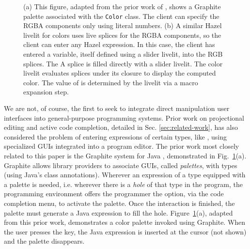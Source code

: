 \begin{figure}
  \caption{
  (a) This figure, adapted from the prior work of \citet{Graphite},
  shows a Graphite palette associated with the \texttt{Color} class.
  The client can specify the RGBA components only using literal numbers.
  (b) A similar Hazel livelit for colors uses live splices for the RGBA components,
  so the client can enter any Hazel expression.
  In this case, the client has entered a variable, itself defined using a slider livelit, into the RGB
  splices. The A splice is filled directly with a slider livelit.
  The color livelit evaluates splices under its closure to display the
  computed color.
  The value of  is determined by the livelit via a macro expansion step.}
  \label{fig:color}
\end{figure}

We are not, of course, the first to seek to integrate direct manipulation user interfaces
into general-purpose programming systems.
Prior work on projectional editing
and active code completion, detailed in Sec. \ref{sec:related-work},
has also considered the problem of entering expressions
of certain types, like ,
using specialized GUIs integrated into a program editor.
The prior work most closely related to this paper is the {Graphite} system for Java \cite{Graphite},
demonstrated in Fig.~\ref{fig:color}(a).
Graphite allows library providers to associate GUIs, called \emph{palettes}, with types (using Java's class annotations).
Wherever an expression of a type equipped with a palette is needed,
i.e. wherever there is a \emph{hole} of that type in the program,
the programming environment offers the programmer the option, via the code completion menu,
to activate the palette.
Once the interaction is finished, the palette must generate a
Java expression to fill the hole.
Figure~\ref{fig:color}(a), adapted from this prior work, demonstrates a color palette invoked using Graphite.
When the user presses the  key, the Java expression  is inserted at the cursor (not shown) and the palette disappears.

